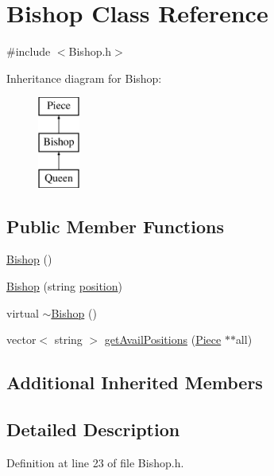 \hypertarget{class_bishop}{}\section{Bishop Class Reference}
\label{class_bishop}


{\ttfamily \#include $<$Bishop.\+h$>$}

Inheritance diagram for Bishop\+:\begin{figure}[H]
\begin{center}
\leavevmode
\includegraphics[height=3.000000cm]{class_bishop}
\end{center}
\end{figure}
\subsection*{Public Member Functions}
\begin{DoxyCompactItemize}
\item 
\hyperlink{class_bishop_af4568da25142a681c699ee046e3a630b}{Bishop} ()
\item 
\hyperlink{class_bishop_adf07e0993c6cc5b99aa326cde0e32e95}{Bishop} (string \hyperlink{class_piece_a1b93d0ecc14e15fc7f3fb5def518502a}{position})
\item 
virtual \hyperlink{class_bishop_a3705b4537a39d09a59143fe01a62442f}{$\sim$\+Bishop} ()
\item 
vector$<$ string $>$ \hyperlink{class_bishop_aa5f69fac3ca28996f5c40e34f68822be}{get\+Avail\+Positions} (\hyperlink{class_piece}{Piece} $\ast$$\ast$all)
\end{DoxyCompactItemize}
\subsection*{Additional Inherited Members}


\subsection{Detailed Description}


Definition at line 23 of file Bishop.\+h.



